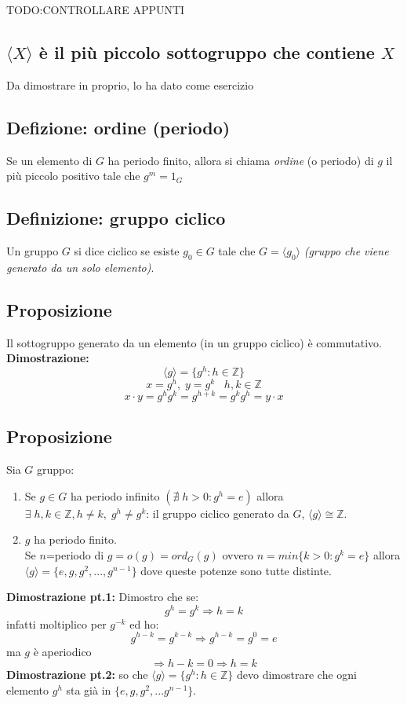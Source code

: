 TODO:CONTROLLARE APPUNTI

\subsection{\(\langle X\rangle\) è il più piccolo sottogruppo che contiene \(X\)}
Da dimostrare in proprio, lo ha dato come esercizio

\subsection{Defizione: ordine (periodo)}
Se un elemento di \(G\) ha periodo finito, allora si chiama \textit{ordine} (o periodo) di \(g\) il più piccolo positivo tale che \(g^m=1_G\)

\subsection{Definizione: gruppo ciclico}
Un gruppo \(G\) si dice ciclico se esiste \(g_0\in G\) tale che \(G=\langle g_0\rangle\) \textit{(gruppo che viene generato da un solo elemento)}.

\subsection{Proposizione}
Il sottogruppo generato da un elemento (in un gruppo ciclico) è commutativo.
\\
\textbf{Dimostrazione:}
\[\langle g\rangle =\{g^h:h\in\mathbb{Z}\}\]
\[x=g^h,\;y=g^k\;\;\;h,k\in\mathbb{Z}\]
\[x\cdot y=g^hg^k=g^{h+k}=g^kg^h=y\cdot x\]

\subsection{Proposizione}
Sia \(G\) gruppo:
\begin{enumerate}

	\item Se \(g\in G\) ha periodo infinito \((\nexists \;h>0:g^h=e)\) allora \(\exists\; h,k\in\mathbb{Z}, h\neq k,\;g^h\neq g^k\): il gruppo ciclico generato da \(G\), \(\langle g\rangle \cong\mathbb{Z}\).

	\item \(g\) ha periodo finito.
	\\Se \(n\)=periodo di \(g=o(g)=ord_G(g)\) %
	ovvero \(n=min\{k>0: g^k=e\}\) allora \(\langle g\rangle=\{e,g,g^2,...,g^{n-1}\}\) dove queste potenze sono tutte distinte.

\end{enumerate}
\textbf{Dimostrazione pt.1:} Dimostro che se:
\[g^h=g^k\Rightarrow h=k\]
infatti moltiplico per \(g^{-k}\) ed ho:
\[g^{h-k}=g^{k-k}\Rightarrow g^{h-k}=g^0=e\]
ma \(g\) è aperiodico 
\[\Rightarrow h-k=0\Rightarrow h=k\]
\textbf{Dimostrazione pt.2:} so che \(\langle g\rangle =\{g^h:h\in\mathbb{Z}\}\) devo dimostrare che ogni elemento \(g^h\) sta già in \(\{e,g,g^2,...g^{n-1}\}\).

